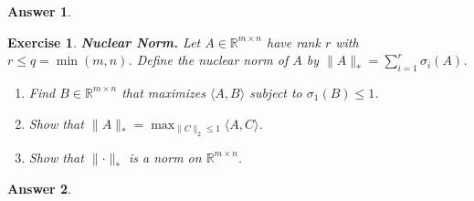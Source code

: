 \documentclass[12pt]{article}
\theoremstyle{colon}
\newtheorem{exercise}{Exercise}
\newtheorem*{answer}{Answer}
\begin{document}
\begin{answer}
\end{answer}

\clearpage

\begin{exercise}
  \textbf{Nuclear Norm.} Let $A \in \mathbb{R}^{m \times n}$ have rank $r$ with $r \leq q = \min (m,n)$. Define the nuclear norm of $A$ by $\lVert A \rVert_* = \sum_{i=1}^r \sigma_i(A)$.

  \begin{enumerate}[label=\alph*)]
    \item Find $B \in \mathbb{R}^{m \times n}$ that maximizes $\langle A, B \rangle$ subject to $\sigma_1(B) \leq 1$.
    \item Show that $\lVert A \rVert_* = \max_{\lVert C \rVert_2 \leq 1} \langle A, C \rangle$.
    \item Show that $\lVert \cdot \rVert_*$ is a norm on $\mathbb{R}^{m \times n}$.
  \end{enumerate}
\end{exercise}

\begin{answer}
\end{answer}
\end{document}
